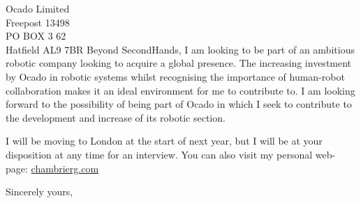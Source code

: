 \documentclass[11pt]{letter} %
\begin{document}
\begin{letter}{Ocado Limited\\ Freepost 13498\\ PO BOX 3 62\\ Hatfield AL9 7BR}
Beyond SecondHands, I am looking to be part of an ambitious robotic company looking to 
acquire a global presence.  The increasing investment by Ocado in robotic systems whilst 
recognising the importance of human-robot collaboration makes it an ideal environment 
for me to contribute to. I am looking forward to the possibility of being part of 
Ocado in which I seek to contribute to the development and increase of its robotic 
section.

I will be moving to London at the start of next year, but I will be at your disposition at any
time for an interview. You can also visit my personal web-page: \href{www.chambrierg.com}{chambrierg.com}

\closing{Sincerely yours,}



\end{letter}
\end{document}
